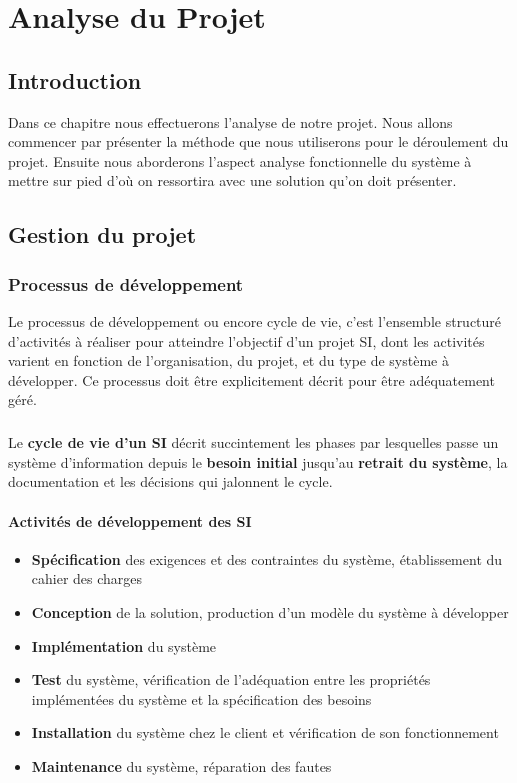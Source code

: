 \chapter{Analyse du Projet}

\section*{Introduction}%
%
Dans ce chapitre nous effectuerons l’analyse de notre projet. Nous allons commencer par présenter la méthode que nous utiliserons pour le déroulement du projet. Ensuite nous aborderons l’aspect analyse fonctionnelle du système à mettre sur pied d’où on ressortira avec une solution qu’on doit présenter.
\section{Gestion du projet }
\subsection{Processus de développement }
Le processus de développement ou encore cycle de vie, c'est l'ensemble structuré d'activités à réaliser pour atteindre l'objectif d'un projet SI, dont les activités varient en fonction de l'organisation, du projet, et du type de système à développer. Ce processus doit être explicitement décrit pour être adéquatement géré. 
\paragraph{}
Le \textbf{cycle de vie d'un SI} décrit succintement les phases par lesquelles passe un système d'information depuis le \textbf{besoin initial} jusqu'au \textbf{retrait du système}, la documentation et les décisions qui jalonnent le cycle.

\subsubsection{Activités de développement des SI}
\begin{itemize}
    \item \textbf{Spécification} des exigences et des contraintes du système, établissement du cahier des charges
    \item \textbf{Conception} de la solution, production d'un modèle du système à développer
    \item \textbf{Implémentation} du système
    \item \textbf{Test} du système, vérification de l'adéquation entre les propriétés implémentées du système et la spécification des besoins
    \item \textbf{Installation} du système chez le client et vérification de son fonctionnement
    \item \textbf{Maintenance} du système, réparation des fautes
\end{itemize}


